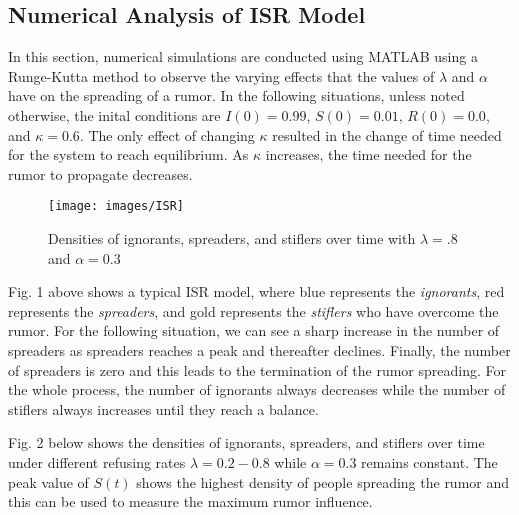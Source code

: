 \documentclass[11pt]{article}
\begin{document}


 





\subsection{Numerical Analysis of ISR Model}
In this section, numerical simulations are conducted using MATLAB using a Runge-Kutta method to observe the varying effects that the values of $\lambda$ and $\alpha$ have on the spreading of a rumor. In the following situations, unless noted otherwise, the inital conditions are $I(0) = 0.99$, $S(0) = 0.01$, $R(0) = 0.0$, and $\kappa = 0.6$. The only effect of changing $\kappa$ resulted in the change of time needed for the system to reach equilibrium. As $\kappa$ increases, the time needed for the rumor to propagate decreases. 

\begin{figure}[h!] 
\begin{center}
\texttt{[image: images/ISR]}
\caption{Densities of ignorants, spreaders, and stiflers over time with $\lambda =.8$ and $\alpha = 0.3$} \label{ffc}
\end{center}
\end{figure} 

Fig. 1 above shows a typical ISR model, where blue represents the \textit{ignorants}, red represents the \textit{spreaders}, and gold represents the \textit{stiflers} who have overcome the rumor. For the following situation, we can see a sharp increase in the number of spreaders as spreaders reaches a peak and thereafter declines. Finally, the number of spreaders is zero and this leads to the termination of the rumor spreading. For the whole process, the number of ignorants always decreases while the number of stiflers always increases until they reach a balance. 

Fig. 2 below shows the densities of ignorants, spreaders, and stiflers over time under different refusing rates $\lambda = 0.2-0.8$ while $\alpha = 0.3$ remains constant. The peak value of $S(t)$ shows the highest density of people spreading the rumor and this can be used to measure the maximum rumor influence. 
\end{document}
